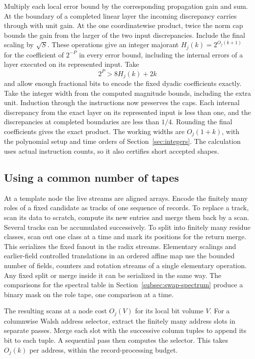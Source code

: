 Multiply each local error bound by the corresponding propagation
gain and sum. At the boundary of a completed linear layer the
incoming discrepancy carries through with unit gain. At the one
coordinatewise product, twice the norm cap bounds the gain from
the larger of the two input discrepancies. Include the final
scaling by $\sqrt S$. These operations give an integer majorant
$H_j(k)=2^{O_j(k+1)}$ for the coefficient of $2^{-P}$ in every
error bound, including the internal errors of a layer executed on
its represented input. Take
\[
                     2^P>8H_j(k)+2k
\]
and allow enough fractional bits to encode the fixed dyadic
coefficients exactly. Take the integer width from the computed
magnitude bounds, including the extra unit. Induction through
the instructions now preserves the caps. Each internal discrepancy
from the exact layer on its represented input is less than one,
and the discrepancies at completed boundaries are less than $1/4$.
Rounding the final coefficients gives the exact product. The
working widths are $O_j(1+k)$, with the polynomial setup and
time orders of Section~\ref{sec:integers}. The calculation uses
actual instruction counts, so it also certifies short accepted
shapes.

\subsection{Using a common number of tapes}

At a template node the live streams are aligned arrays. Encode the
finitely many roles of a fixed candidate as tracks of one sequence
of records. To replace a track, scan its data to scratch, compute
its new entries and merge them back by a scan. Several tracks can
be accumulated successively. To split into finitely many residue
classes, scan out one class at a time and mark its positions for
the return merge. This serializes the fixed fanout in the radix
streams. Elementary scalings and earlier-field controlled
translations in an ordered affine map use the bounded number of
fields, counters and rotation streams of a single elementary
operation. Any fixed split or merge inside it can be serialized
in the same way. The comparisons for the spectral table in
Section~\ref{subsec:swap-spectrum} produce a binary mask on the
role tape, one comparison at a time.

The resulting scans at a node cost $O_j(V)$ for its local bit
volume $V$. For a columnwise Walsh address selector, extract the
finitely many address slots in separate passes. Merge each slot
with the successive column tuples to append its bit to each
tuple. A sequential pass then computes the selector. This
takes $O_j(k)$ per address, within the record-processing budget.

